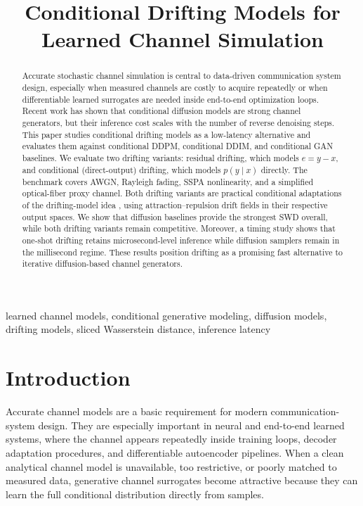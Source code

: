 \documentclass[conference]{IEEEtran}
\title{Conditional Drifting Models for Learned Channel Simulation}
\author{
\IEEEauthorblockN{Rick Fritschek and Rafael F. Scheafer}
\IEEEauthorblockA{TU Dresden, Germany}
}
\begin{document}
\maketitle

\begin{abstract}
Accurate stochastic channel simulation is central to data-driven communication system design, especially when measured channels are costly to acquire repeatedly or when differentiable learned surrogates are needed inside end-to-end optimization loops.
Recent work has shown that conditional diffusion models are strong channel generators, but their inference cost scales with the number of reverse denoising steps.
This paper studies conditional drifting models as a low-latency alternative and evaluates them against conditional DDPM, conditional DDIM, and conditional GAN baselines.
We evaluate two drifting variants: residual drifting, which models \(e = y - x\), and conditional (direct-output) drifting, which models \(p(y\mid x)\) directly.
The benchmark covers AWGN, Rayleigh fading, SSPA nonlinearity, and a simplified optical-fiber proxy channel.
Both drifting variants are practical conditional adaptations of the drifting-model idea \cite{drifting}, using attraction--repulsion drift fields in their respective output spaces.
We show that diffusion baselines provide the strongest SWD overall, while both drifting variants remain competitive. Moreover, a timing study shows that one-shot drifting retains microsecond-level inference while diffusion samplers remain in the millisecond regime.
These results position drifting as a promising fast alternative to iterative diffusion-based channel generators.
\end{abstract}

\begin{IEEEkeywords}
learned channel models, conditional generative modeling, diffusion models, drifting models, sliced Wasserstein distance, inference latency
\end{IEEEkeywords}

\section{Introduction}
Accurate channel models are a basic requirement for modern communication-system design.
They are especially important in neural and end-to-end learned systems, where the channel appears repeatedly inside training loops, decoder adaptation procedures, and differentiable autoencoder pipelines.
When a clean analytical channel model is unavailable, too restrictive, or poorly matched to measured data, generative channel surrogates become attractive because they can learn the full conditional distribution directly from samples.
\end{document}

